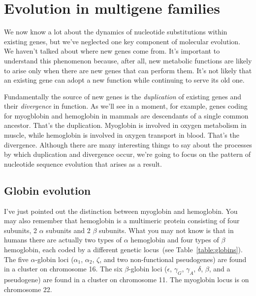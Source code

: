 \chapter{Evolution in multigene families}

We now know a lot about the dynamics of nucleotide substitutions
within existing genes, but we've neglected one key component of
molecular evolution. We haven't talked about where new genes come
from. It's important to understand this phenomenon because, after all,
new metabolic functions are likely to arise only when there are new
genes that can perform them. It's not likely that an existing gene can
adopt a new function while continuing to serve its old one.

Fundamentally the source of new genes is the {\it duplication\/} of
existing genes and their {\it divergence\/} in function. As we'll see
in a moment, for example, genes coding for myogblobin and hemoglobin
in mammals are descendants of a single common ancestor. That's the
duplication. Myoglobin is involved in oxygen metabolism in muscle,
while hemoglobin is involved in oxygen transport in blood. That's the
divergence. Although there are many interesting things to say about
the processes by which duplication and divergence occur, we're going
to focus on the pattern of nucleotide sequence evolution that arises
as a result.

\section*{Globin evolution}

I've just pointed out the distinction between myoglobin and
hemoglobin. You may also remember that hemoglobin is a multimeric
protein consisting of four subunits, 2 $\alpha$ subunits and 2 $\beta$
subunits. What you may not know is that in humans there are actually
two types of $\alpha$ hemoglobin and four types of $\beta$ hemoglobin,
each coded by a different genetic locus~(see
Table~\ref{table:globins}). The five $\alpha$-globin loci ($\alpha_1$,
$\alpha_2$, $\zeta$, and two non-functional pseudogenes) are found in a
cluster on chromosome 16. The six $\beta$-globin loci ($\epsilon$,
$\gamma_G$, $\gamma_A$, $\delta$, $\beta$, and a pseudogene) are found
in a cluster on chromosome 11. The myoglobin locus is on chromosome
22.

